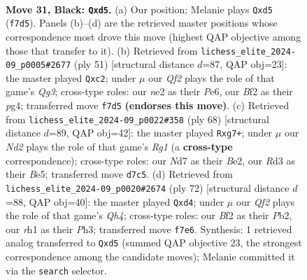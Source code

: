 \documentclass[11pt]{article}
\begin{document}
\clearpage

\begin{figure}[p]\centering
\begin{subfigure}{0.46\textwidth}\centering
\resizebox{\linewidth}{!}{%
\newchessgame
\chessboard[
  setfen={2Q5/pp1n1qkp/7p/1P1B4/3P4/3r4/4Nb2/R4K1R b - - 9 31},
  showmover=false,
  pgfstyle=straightmove, color=movearrow, markmove={f7-d5}
]}
\caption{}
\end{subfigure}\hfill
\begin{subfigure}{0.46\textwidth}\centering
\resizebox{\linewidth}{!}{%
\newchessgame
\chessboard[
  setfen={8/pp1R2pk/2p1p1q1/8/1R4P1/6n1/PBP2P2/6K1 b - - 2 26},
  showmover=false,
  pgfstyle=straightmove, color=movearrow, markmove={g6-c2}
]}
\caption{}
\end{subfigure}
\\[4pt]
\begin{subfigure}{0.46\textwidth}\centering
\resizebox{\linewidth}{!}{%
\newchessgame
\chessboard[
  setfen={5rk1/3r2p1/b1p4p/p3BN2/2P5/3Q4/2K1Bq1P/6R1 w - - 1 35},
  showmover=false,
  pgfstyle=straightmove, color=movearrow, markmove={g1-g7}
]}
\caption{}
\end{subfigure}\hfill
\begin{subfigure}{0.46\textwidth}\centering
\resizebox{\linewidth}{!}{%
\newchessgame
\chessboard[
  setfen={2r5/4rk2/4p2B/3bRp2/3q3Q/7P/PP3PPK/8 w - - 0 37},
  showmover=false,
  pgfstyle=straightmove, color=movearrow, markmove={h4-d4}
]}
\caption{}
\end{subfigure}
\caption{\textbf{Move 31, Black: \texttt{Qxd5}.} (a) Our position; Melanie plays \texttt{Qxd5} (\texttt{f7d5}). Panels (b)--(d) are the retrieved master positions whose correspondence most drove this move (highest QAP objective among those that transfer to it). (b) Retrieved from \texttt{lichess\_elite\_2024-09\_p0005\#2677} (ply 51) [structural distance $d$=87, QAP obj=23]: the master played \texttt{Qxc2}; under $\mu$ our \emph{Qf2} plays the role of that game's \emph{Qg3}; cross-type roles: our \emph{n}e2 as their \emph{P}e6, our \emph{B}f2 as their \emph{p}g4; transferred move \texttt{f7d5} \textbf{(endorses this move)}. (c) Retrieved from \texttt{lichess\_elite\_2024-09\_p0022\#358} (ply 68) [structural distance $d$=89, QAP obj=42]: the master played \texttt{Rxg7+}; under $\mu$ our \emph{Nd2} plays the role of that game's \emph{Rg1} (a \textbf{cross-type} correspondence); cross-type roles: our \emph{N}d7 as their \emph{B}e2, our \emph{R}d3 as their \emph{B}e5; transferred move \texttt{d7c5}. (d) Retrieved from \texttt{lichess\_elite\_2024-09\_p0020\#2674} (ply 72) [structural distance $d$=88, QAP obj=40]: the master played \texttt{Qxd4}; under $\mu$ our \emph{Qf2} plays the role of that game's \emph{Qh4}; cross-type roles: our \emph{B}f2 as their \emph{P}b2, our \emph{r}h1 as their \emph{P}h3; transferred move \texttt{f7e6}. Synthesis: 1 retrieved analog transferred to \texttt{Qxd5} (summed QAP objective 23, the strongest correspondence among the candidate moves); Melanie committed it via the \texttt{search} selector.}
\label{fig:thought-m61}
\end{figure}
\end{document}
